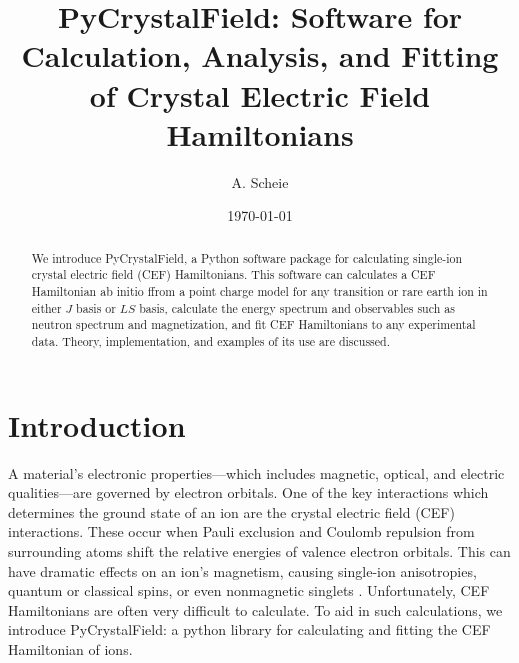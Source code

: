 \documentclass[twocolumn,english,prb]{revtex4-2}
\begin{document}
	
	\title{PyCrystalField: Software for Calculation, Analysis, and Fitting of Crystal Electric Field Hamiltonians}
	
	\author{A. Scheie}
	\address{Neutron Scattering Division, Oak Ridge National Laboratory, Oak Ridge, Tennessee 37831, USA}
	
	
\date{\today}

\begin{abstract}
We introduce PyCrystalField, a Python software package for calculating single-ion crystal electric field (CEF) Hamiltonians. This software can calculates a CEF Hamiltonian ab initio ffrom a point charge model for any transition or rare earth ion in either $J$ basis or $LS$  basis, calculate the energy spectrum and observables such as neutron spectrum and magnetization, and fit CEF Hamiltonians to any experimental data. Theory, implementation, and examples of its use are discussed.
\end{abstract}

\maketitle





\section{Introduction}



A material's electronic properties---which includes magnetic, optical, and electric qualities---are governed by electron orbitals. One of the key interactions which determines the ground state of an ion are the crystal electric field (CEF) interactions. These occur when Pauli exclusion and Coulomb repulsion from surrounding atoms shift the relative energies of valence electron orbitals. This can have dramatic effects on an ion's magnetism, causing single-ion anisotropies, quantum or classical spins, or even nonmagnetic singlets \cite{AbragamBleaney}. Unfortunately, CEF Hamiltonians are often very difficult to calculate. To aid in such calculations, we introduce PyCrystalField: a python library for calculating and fitting the CEF Hamiltonian of ions.
\end{document}
